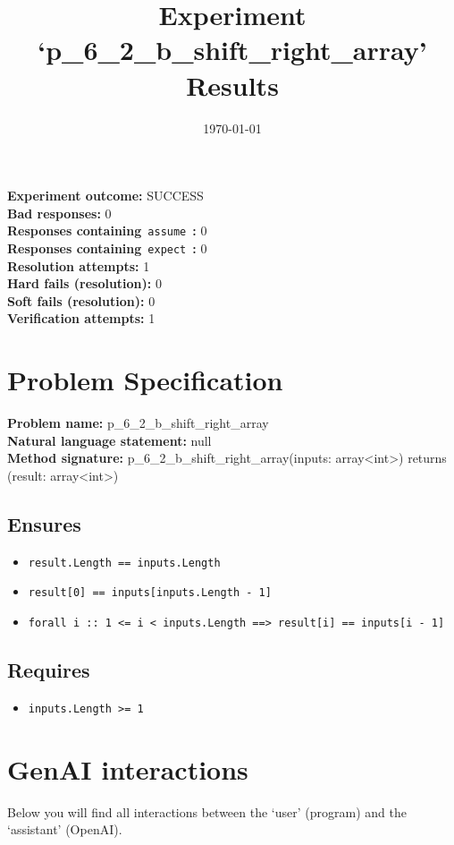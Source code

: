 \documentclass{article}
\begin{document}
\title{Experiment `p\_6\_2\_b\_shift\_right\_array' Results}
\author{\today}
\date{}
\maketitle
\textbf{Experiment outcome: }SUCCESS
\\\textbf{Bad responses: }0
\\\textbf{Responses containing}~\texttt{assume}~\textbf{: }0
\\\textbf{Responses containing}~\texttt{expect}~\textbf{: }0
\\\textbf{Resolution attempts: }1
\\\textbf{Hard fails (resolution): }0
\\\textbf{Soft fails (resolution): }0
\\\textbf{Verification attempts: }1
\section*{Problem Specification}
\textbf{Problem name: }p\_6\_2\_b\_shift\_right\_array
\\\textbf{Natural language statement: }null
\\\textbf{Method signature: }p\_6\_2\_b\_shift\_right\_array(inputs: array<int>) returns (result: array<int>)
\subsection*{Ensures}
\begin{itemize}
\item \texttt{result.Length == inputs.Length}
\item \texttt{result[0] == inputs[inputs.Length - 1]}
\item \texttt{forall i :: 1 <= i < inputs.Length ==> result[i] == inputs[i - 1]}
\end{itemize}
\subsection*{Requires}
\begin{itemize}
\item \texttt{inputs.Length >= 1}
\end{itemize}
\clearpage
\section*{GenAI interactions}
Below you will find all interactions between the `user' (program) and the `assistant' (OpenAI).
\end{document}
